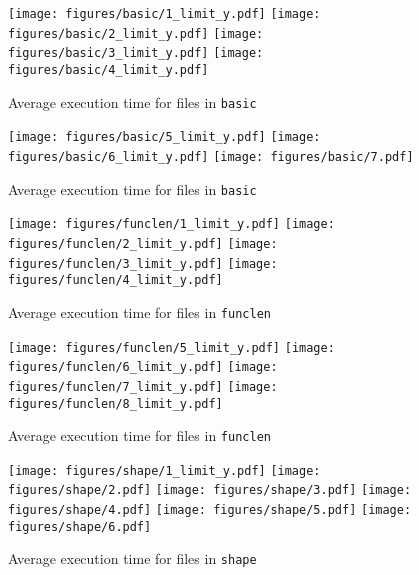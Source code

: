 \documentclass[11pt,dvipsnames]{article}
\newcommand{\mono}[1]{\texttt{#1}}
\begin{document}
\begin{figure}[ht]
    \centering
    \texttt{[image: figures/basic/1\_limit\_y.pdf]}
    \texttt{[image: figures/basic/2\_limit\_y.pdf]}
    \texttt{[image: figures/basic/3\_limit\_y.pdf]}
    \texttt{[image: figures/basic/4\_limit\_y.pdf]}
    \caption{Average execution time for files in \mono{basic} }
    \label{fig:results_basic_a}
\end{figure}

\begin{figure}[ht]
    \centering
    \texttt{[image: figures/basic/5\_limit\_y.pdf]}
    \texttt{[image: figures/basic/6\_limit\_y.pdf]}
    \texttt{[image: figures/basic/7.pdf]}
    \caption{Average execution time for files in \mono{basic} }
    \label{fig:results_basic_b}
\end{figure}

\begin{figure}[ht]
    \centering
    \texttt{[image: figures/funclen/1\_limit\_y.pdf]}
    \texttt{[image: figures/funclen/2\_limit\_y.pdf]}
    \texttt{[image: figures/funclen/3\_limit\_y.pdf]}
    \texttt{[image: figures/funclen/4\_limit\_y.pdf]}
    \caption{Average execution time for files in \mono{funclen} }
    \label{fig:results_funclenc_a}
\end{figure}

\begin{figure}[ht]
    \centering
    \texttt{[image: figures/funclen/5\_limit\_y.pdf]}
    \texttt{[image: figures/funclen/6\_limit\_y.pdf]}
    \texttt{[image: figures/funclen/7\_limit\_y.pdf]}
    \texttt{[image: figures/funclen/8\_limit\_y.pdf]}
    \caption{Average execution time for files in \mono{funclen} }
    \label{fig:results_funclen_a}
\end{figure}

\begin{figure}[ht]
    \centering
    \texttt{[image: figures/shape/1\_limit\_y.pdf]}
    \texttt{[image: figures/shape/2.pdf]}
    \texttt{[image: figures/shape/3.pdf]}
    \texttt{[image: figures/shape/4.pdf]}
    \texttt{[image: figures/shape/5.pdf]}
    \texttt{[image: figures/shape/6.pdf]}
    \caption{Average execution time for files in \mono{shape} }
    \label{fig:results_shape}
\end{figure}
\end{document}
